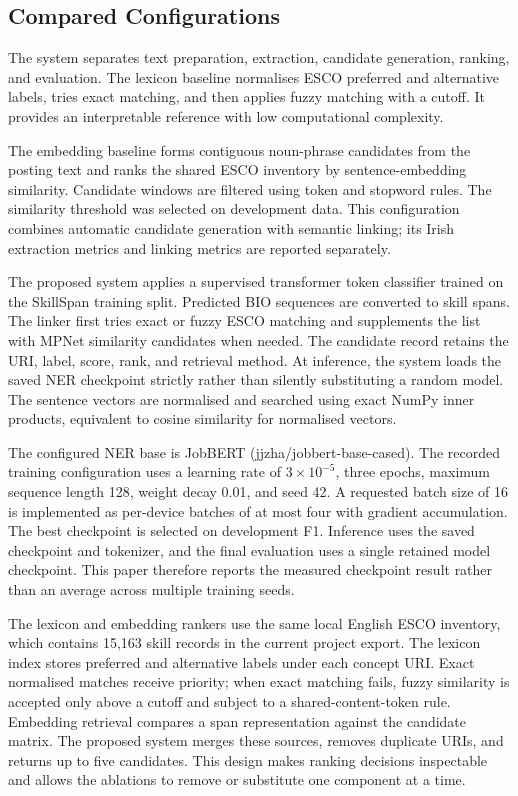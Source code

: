 \documentclass[conference]{IEEEtran}
\begin{document}
\subsection{Compared Configurations}
The system separates text preparation, extraction, candidate generation, ranking, and evaluation. The lexicon baseline normalises ESCO preferred and alternative labels, tries exact matching, and then applies fuzzy matching with a cutoff. It provides an interpretable reference with low computational complexity.

The embedding baseline forms contiguous noun-phrase candidates from the posting text and ranks the shared ESCO inventory by sentence-embedding similarity. Candidate windows are filtered using token and stopword rules. The similarity threshold was selected on development data. This configuration combines automatic candidate generation with semantic linking; its Irish extraction metrics and linking metrics are reported separately.

The proposed system applies a supervised transformer token classifier trained on the SkillSpan training split. Predicted BIO sequences are converted to skill spans. The linker first tries exact or fuzzy ESCO matching and supplements the list with MPNet similarity candidates when needed. The candidate record retains the URI, label, score, rank, and retrieval method. At inference, the system loads the saved NER checkpoint strictly rather than silently substituting a random model. The sentence vectors are normalised and searched using exact NumPy inner products, equivalent to cosine similarity for normalised vectors.

The configured NER base is JobBERT (\textsf{jjzha/jobbert-base-cased}). The recorded training configuration uses a learning rate of $3\times10^{-5}$, three epochs, maximum sequence length 128, weight decay 0.01, and seed 42. A requested batch size of 16 is implemented as per-device batches of at most four with gradient accumulation. The best checkpoint is selected on development F1. Inference uses the saved checkpoint and tokenizer, and the final evaluation uses a single retained model checkpoint. This paper therefore reports the measured checkpoint result rather than an average across multiple training seeds.

The lexicon and embedding rankers use the same local English ESCO inventory, which contains 15,163 skill records in the current project export. The lexicon index stores preferred and alternative labels under each concept URI. Exact normalised matches receive priority; when exact matching fails, fuzzy similarity is accepted only above a cutoff and subject to a shared-content-token rule. Embedding retrieval compares a span representation against the candidate matrix. The proposed system merges these sources, removes duplicate URIs, and returns up to five candidates. This design makes ranking decisions inspectable and allows the ablations to remove or substitute one component at a time.
\end{document}
